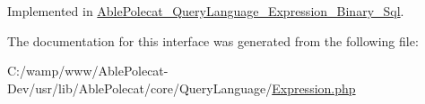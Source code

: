 Implemented in \hyperlink{class_able_polecat___query_language___expression___binary___sql_a7516ca30af0db3cdbf9a7739b48ce91d}{Able\+Polecat\+\_\+\+Query\+Language\+\_\+\+Expression\+\_\+\+Binary\+\_\+\+Sql}.



The documentation for this interface was generated from the following file\+:\begin{DoxyCompactItemize}
\item 
C\+:/wamp/www/\+Able\+Polecat-\/\+Dev/usr/lib/\+Able\+Polecat/core/\+Query\+Language/\hyperlink{_expression_8php}{Expression.\+php}\end{DoxyCompactItemize}
